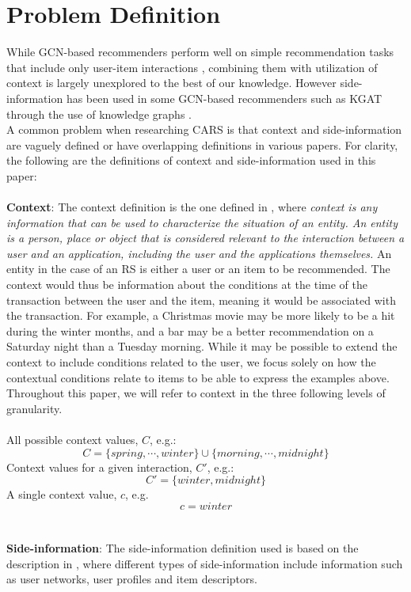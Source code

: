\section{Problem Definition}\label{sec:problemdef}
While GCN-based recommenders perform well on simple recommendation tasks that include only user-item interactions \cite{NGCF,LightGCN}, combining them with utilization of context is largely unexplored to the best of our knowledge. However side-information has been used in some GCN-based recommenders such as KGAT through the use of knowledge graphs \cite{KGAT}.\\
A common problem when researching CARS is that context and side-information are vaguely defined or have overlapping definitions in various papers.
For clarity, the following are the definitions of context and side-information used in this paper:
\\\\
\textbf{Context}:
The context definition is the one defined in \cite{contextDefinition}, where \textit{context is any information that can be used to characterize the situation of an entity. An entity is a person, place or object that is considered relevant to the interaction between a user and an application, including the user and the applications themselves.}
An entity in the case of an RS is either a user or an item to be recommended.
The context would thus be information about the conditions at the time of the transaction between the user and the item, meaning it would be associated with the transaction.
For example, a Christmas movie may be more likely to be a hit during the winter months, and a bar may be a better recommendation on a Saturday night than a Tuesday morning.
While it may be possible to extend the context to include conditions related to the user, we focus solely on how the contextual conditions relate to items to be able to express the examples above.\\
Throughout this paper, we will refer to context in the three following levels of granularity.\\\\
All possible context values, $C$, e.g.:
$$C = \{spring, \cdots, winter\} \cup \{morning, \cdots, midnight\}$$
Context values for a given interaction, $C'$, e.g.:
$$C' = \{winter, midnight\}$$
A single context value, $c$, e.g. 
$$c = winter$$
\\\\
\textbf{Side-information}:
The side-information definition used is based on the description in \cite{SideInfoDefinition}, where different types of side-information include information such as user networks, user profiles and item descriptors.
